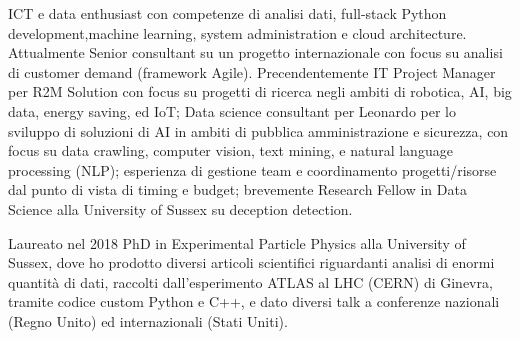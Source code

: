 
ICT e data enthusiast con competenze di analisi dati, full-stack Python development,machine learning, system administration e cloud architecture. Attualmente Senior consultant su un progetto internazionale con focus su analisi di customer demand (framework Agile). Precendentemente IT Project Manager per R2M Solution con focus su progetti di ricerca negli ambiti di robotica, AI, big data, energy saving, ed IoT; Data science consultant per Leonardo per lo sviluppo di soluzioni di AI in ambiti di pubblica amministrazione e sicurezza, con focus su data crawling, computer vision, text mining, e natural language processing (NLP); esperienza di gestione team e coordinamento progetti/risorse dal punto di vista di timing e budget; brevemente Research Fellow in Data Science alla University of Sussex su deception detection. 

Laureato nel 2018 PhD in Experimental Particle Physics alla University of Sussex, dove ho prodotto diversi articoli scientifici riguardanti analisi di enormi quantità di dati, raccolti dall'esperimento ATLAS al LHC (CERN) di Ginevra, tramite codice custom Python e C++, e dato diversi talk a conferenze nazionali (Regno Unito) ed internazionali (Stati Uniti).